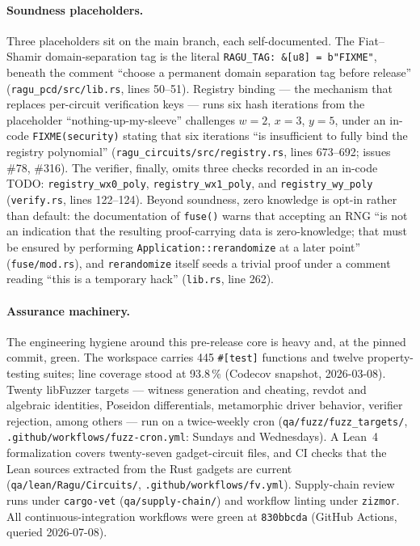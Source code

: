 \documentclass[11pt,a4paper]{article}
\theoremstyle{definition}
\begin{document}
\paragraph{Soundness placeholders.}
Three placeholders sit on the main branch, each self-documented. The
Fiat--Shamir domain-separation tag is the literal
\texttt{RAGU\_TAG: \&[u8] = b"FIXME"}, beneath the comment ``choose a
permanent domain separation tag before release''
(\texttt{ragu\_pcd/src/lib.rs}, lines 50--51). Registry binding ---
the mechanism that replaces per-circuit verification keys --- runs six hash
iterations from the placeholder ``nothing-up-my-sleeve'' challenges $w = 2$,
$x = 3$, $y = 5$, under an in-code \texttt{FIXME(security)} stating that six
iterations ``is insufficient to fully bind the registry polynomial''
(\texttt{ragu\_circuits/src/registry.rs}, lines 673--692; issues
\#78, \#316). The verifier, finally, omits three checks recorded in an
in-code TODO: \texttt{registry\_wx0\_poly}, \texttt{registry\_wx1\_poly},
and \texttt{registry\_wy\_poly} (\texttt{verify.rs}, lines 122--124).
Beyond soundness, zero knowledge is opt-in rather than default: the
documentation of \texttt{fuse()} warns that accepting an RNG ``is not an
indication that the resulting proof-carrying data is zero-knowledge; that
must be ensured by performing \texttt{Application::rerandomize} at a later
point'' (\texttt{fuse/mod.rs}), and \texttt{rerandomize} itself seeds a
trivial proof under a comment reading ``this is a temporary hack''
(\texttt{lib.rs}, line 262).

\paragraph{Assurance machinery.}
The engineering hygiene around this pre-release core is heavy and, at the
pinned commit, green. The workspace carries 445 \texttt{\#[test]} functions
and twelve property-testing suites; line coverage stood at 93.8\,\%
(Codecov snapshot, 2026-03-08). Twenty libFuzzer targets --- witness
generation and cheating, revdot and algebraic identities, Poseidon
differentials, metamorphic driver behavior, verifier rejection, among
others --- run on a twice-weekly cron
(\texttt{qa/fuzz/fuzz\_targets/},
\texttt{.github/workflows/fuzz-cron.yml}: Sundays and Wednesdays). A Lean~4
formalization covers twenty-seven gadget-circuit files, and CI checks that
the Lean sources extracted from the Rust gadgets are current
(\texttt{qa/lean/Ragu/Circuits/}, \texttt{.github/workflows/fv.yml}).
Supply-chain review runs under \texttt{cargo-vet}
(\texttt{qa/supply-chain/}) and workflow linting under \texttt{zizmor}. All
continuous-integration workflows were green at \texttt{830bbcda} (GitHub
Actions, queried 2026-07-08).
\end{document}
